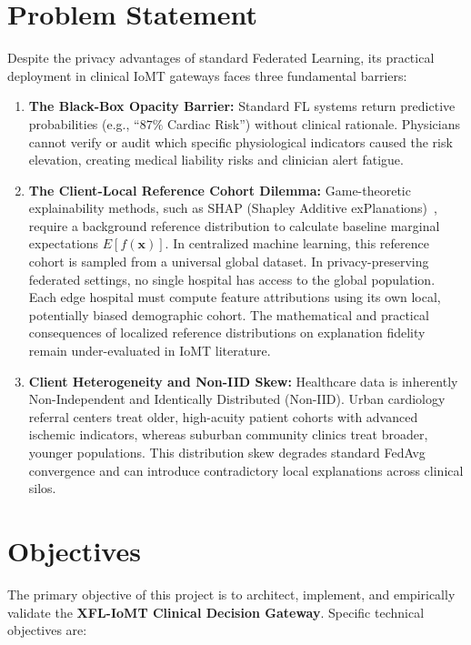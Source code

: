\documentclass[12pt,a4paper,oneside]{report}
\begin{document}
\section{Problem Statement}
Despite the privacy advantages of standard Federated Learning, its practical deployment in clinical IoMT gateways faces three fundamental barriers:

\begin{enumerate}
    \item \textbf{The Black-Box Opacity Barrier:} Standard FL systems return predictive probabilities (e.g., ``$87\%$ Cardiac Risk'') without clinical rationale. Physicians cannot verify or audit which specific physiological indicators caused the risk elevation, creating medical liability risks and clinician alert fatigue.
    \item \textbf{The Client-Local Reference Cohort Dilemma:} Game-theoretic explainability methods, such as SHAP (Shapley Additive exPlanations)~\cite{lundberg2017unified}, require a background reference distribution to calculate baseline marginal expectations $E[f(\mathbf{x})]$. In centralized machine learning, this reference cohort is sampled from a universal global dataset. In privacy-preserving federated settings, no single hospital has access to the global population. Each edge hospital must compute feature attributions using its own local, potentially biased demographic cohort. The mathematical and practical consequences of localized reference distributions on explanation fidelity remain under-evaluated in IoMT literature.
    \item \textbf{Client Heterogeneity and Non-IID Skew:} Healthcare data is inherently Non-Independent and Identically Distributed (Non-IID). Urban cardiology referral centers treat older, high-acuity patient cohorts with advanced ischemic indicators, whereas suburban community clinics treat broader, younger populations. This distribution skew degrades standard FedAvg convergence and can introduce contradictory local explanations across clinical silos.
\end{enumerate}

\section{Objectives}
The primary objective of this project is to architect, implement, and empirically validate the \textbf{XFL-IoMT Clinical Decision Gateway}. Specific technical objectives are:
\end{document}
